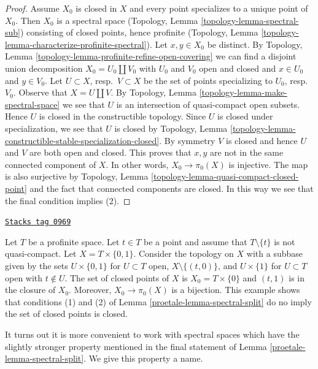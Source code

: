 \begin{proof}
\medskip\noindent
Assume $X_0$ is closed in $X$ and every point specializes to a unique
point of $X_0$. Then $X_0$ is a spectral space
(Topology, Lemma \ref{topology-lemma-spectral-sub})
consisting of closed points, hence profinite
(Topology, Lemma \ref{topology-lemma-characterize-profinite-spectral}).
Let $x, y \in X_0$ be distinct. By
Topology, Lemma \ref{topology-lemma-profinite-refine-open-covering}
we can find a disjoint union decomposition
$X_0 = U_0 \amalg V_0$ with $U_0$ and $V_0$ open and closed
and $x \in U_0$ and $y \in V_0$.
Let $U \subset X$, resp.\ $V \subset X$
be the set of points specializing to $U_0$, resp.\ $V_0$.
Observe that $X = U \amalg V$.
By Topology, Lemma \ref{topology-lemma-make-spectral-space}
we see that $U$ is an intersection of quasi-compact open subsets.
Hence $U$ is closed in the constructible topology.
Since $U$ is closed under specialization, we see that
$U$ is closed by Topology, Lemma
\ref{topology-lemma-constructible-stable-specialization-closed}.
By symmetry $V$ is closed and hence $U$ and $V$ are both
open and closed.
This proves that $x, y$ are not in the same connected component of $X$.
In other words, $X_0 \to \pi_0(X)$ is injective. The map is also
surjective by
Topology, Lemma \ref{topology-lemma-quasi-compact-closed-point}
and the fact that connected components are closed.
In this way we see that the final condition implies (2).
\end{proof}

\begin{example}
\label{proetale-example-not-w-local}
\href{https://stacks.math.columbia.edu/tag/0969}{\texttt{Stacks tag 0969}}

Let $T$ be a profinite space. Let $t \in T$ be a point and assume
that $T \setminus \{t\}$ is not quasi-compact.
Let $X = T \times \{0, 1\}$. Consider the topology on $X$
with a subbase given by the sets
$U \times \{0, 1\}$ for $U \subset T$ open, $X \setminus \{(t, 0)\}$,
and $U \times \{1\}$ for $U \subset T$ open with $t \not \in U$.
The set of closed points of $X$ is $X_0 = T \times \{0\}$ and
$(t, 1)$ is in the closure of $X_0$.
Moreover, $X_0 \to \pi_0(X)$ is a bijection.
This example shows that conditions (1) and (2) of
Lemma \ref{proetale-lemma-spectral-split} do no imply the set of closed points
is closed.
\end{example}

It turns out it is more convenient to work with spectral
spaces which have the slightly stronger property mentioned in
the final statement of Lemma \ref{proetale-lemma-spectral-split}.
We give this property a name.

